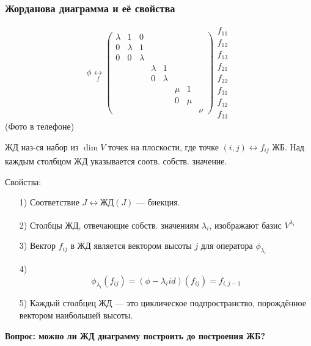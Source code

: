 \subsubsection{Жорданова диаграмма и её свойства}
\begin{example}
    \[
        \phi \underset{f}{\longleftrightarrow} \begin{pmatrix} \lambda & 1 & 0 \\ 0 & \lambda & 1 \\ 0 & 0 & \lambda \\ & & & \lambda & 1 \\ & & & 0 & \lambda \\ & & & & & \mu & 1 \\ & & & & & 0 & \mu \\ & & & & & & & \nu \end{pmatrix} \begin{matrix} f_{11} \\ f_{12} \\ f_{13} \\ f_{21} \\ f_{22} \\ f_{31} \\ f_{32} \\ f_{33} \end{matrix}
    \]
    (Фото в телефоне)
\end{example}
\begin{definition}
    ЖД наз-ся набор из $\dim V$ точек на плоскости, где точке $(i, j) \underset{}{\longleftrightarrow} f_{ij}$ ЖБ. Над каждым столбцом ЖД указывается соотв. собств. значение.
\end{definition}
Свойства:
\begin{itemize}
    \item [1) ] Соответствие $J \underset{}{\longleftrightarrow} \text{ЖД}(J)$ --- биекция. 
    \item [2) ] Столбцы ЖД, отвечающие собств. значениям $\lambda_i$, изображают базис $V^{\lambda_i}$
    \item [3) ] Вектор $f_{ij}$ в ЖД является вектором высоты $j$ для оператора $\phi_{\lambda_i}$
    \item [4) ] \[
    \phi_{\lambda_i}(f_{ij}) = (\phi - \lambda_i id)(f_{ij}) = f_{i, j - 1}
    \]
\item [5) ] Каждый столбцец ЖД --- это циклическое подпространство, порождённое вектором наибольшей высоты.
\end{itemize}
\textbf{Вопрос: можно ли ЖД диаграмму построить до построения ЖБ?}
